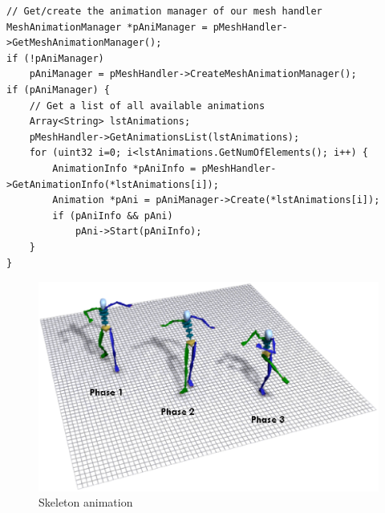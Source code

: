 \begin{lstlisting}[caption=Animation playback]
// Get/create the animation manager of our mesh handler
MeshAnimationManager *pAniManager = pMeshHandler->GetMeshAnimationManager();
if (!pAniManager)
	pAniManager = pMeshHandler->CreateMeshAnimationManager();
if (pAniManager) {
	// Get a list of all available animations
	Array<String> lstAnimations;
	pMeshHandler->GetAnimationsList(lstAnimations);
	for (uint32 i=0; i<lstAnimations.GetNumOfElements(); i++) {
		AnimationInfo *pAniInfo = pMeshHandler->GetAnimationInfo(*lstAnimations[i]);
		Animation *pAni = pAniManager->Create(*lstAnimations[i]);
		if (pAniInfo && pAni)
			pAni->Start(pAniInfo);
	}
}
\end{lstlisting}

\begin{figure}
  \centering
  \includegraphics[scale=0.5]{pics/Joints.eps}
  \caption{Skeleton animation}
  \label{fig:Skeleton animation}
\end{figure}
